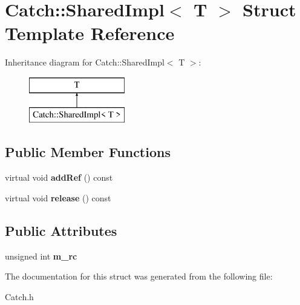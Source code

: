 \hypertarget{struct_catch_1_1_shared_impl}{\section{Catch\-:\-:Shared\-Impl$<$ T $>$ Struct Template Reference}
\label{struct_catch_1_1_shared_impl}
}
Inheritance diagram for Catch\-:\-:Shared\-Impl$<$ T $>$\-:\begin{figure}[H]
\begin{center}
\leavevmode
\includegraphics[height=2.000000cm]{struct_catch_1_1_shared_impl}
\end{center}
\end{figure}
\subsection*{Public Member Functions}
\begin{DoxyCompactItemize}
\item 
\hypertarget{struct_catch_1_1_shared_impl_a9b190b7a139a09d2624d1201d8e4f87e}{virtual void {\bfseries add\-Ref} () const }\label{struct_catch_1_1_shared_impl_a9b190b7a139a09d2624d1201d8e4f87e}

\item 
\hypertarget{struct_catch_1_1_shared_impl_a16baad80ad5ad3dfaf2a10a157a02e01}{virtual void {\bfseries release} () const }\label{struct_catch_1_1_shared_impl_a16baad80ad5ad3dfaf2a10a157a02e01}

\end{DoxyCompactItemize}
\subsection*{Public Attributes}
\begin{DoxyCompactItemize}
\item 
\hypertarget{struct_catch_1_1_shared_impl_a7e71ef1985b85aa41a1632f932a96bcb}{unsigned int {\bfseries m\-\_\-rc}}\label{struct_catch_1_1_shared_impl_a7e71ef1985b85aa41a1632f932a96bcb}

\end{DoxyCompactItemize}


The documentation for this struct was generated from the following file\-:\begin{DoxyCompactItemize}
\item 
Catch.\-h\end{DoxyCompactItemize}
